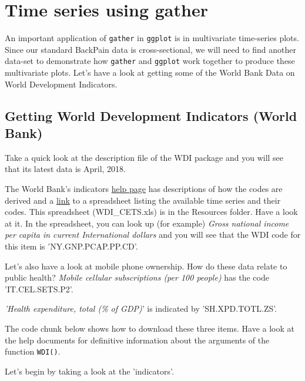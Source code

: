 \documentclass[titlepage]{book}\usepackage{knitr}
\begin{document}
\section{Time series using gather}
An important application of \texttt{gather} in \texttt{ggplot} is in multivariate time-series plots.
Since our standard BackPain data is cross-sectional, we will need to find another data-set to demonstrate how \texttt{gather} and \texttt{ggplot} work together to produce these multivariate plots. Let's have a look at getting some of the World Bank Data on World Development Indicators.

\subsection{Getting World Development Indicators (World Bank)}

Take a quick look at the description file of the WDI package and you will see that its latest data is April, 2018.

The World Bank's indicators \href{https://datahelpdesk.worldbank.org/knowledgebase/articles/201175-how-does-the-world-bank-code-its-indicators}{help page} has descriptions of how the codes are derived and a \href{http://databank.worldbank.org/data/download/site-content/WDI\_CETS.xls}{link} to a spreadsheet listing the available time series and their codes. This spreadsheet (WDI\_CETS.xls) is in the Resources folder. Have a look at it. In the spreadsheet, you can look up (for example) \emph{Gross national income per capita in current International dollars} and you will see that the WDI code for this item is 'NY.GNP.PCAP.PP.CD'.

Let's also have a look at  mobile phone ownership. How do these data relate to public health? \emph{Mobile cellular subscriptions (per 100 people)} has the code 'IT.CEL.SETS.P2'.

\emph{'Health expenditure, total (\% of GDP)}' is indicated by 'SH.XPD.TOTL.ZS'.

The code chunk below shows how to  download these three items. Have a look at the help documents for definitive information about the arguments of the function \texttt{WDI()}.

Let's begin by taking a look at the 'indicators'.

\begin{knitrout}
\color{fgcolor}\begin{kframe}
\begin{alltt}
\hlstd{(}\hlstd{=}\hlstd{,} \hlstd{=}\hlstd{,} \hlstd{=}\hlstd{)}
\end{alltt}
\end{kframe}
\end{knitrout}
\end{document}
